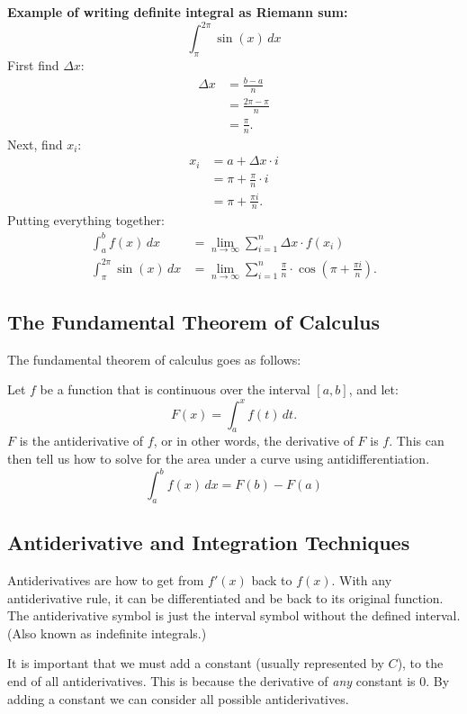 \documentclass[12pt]{article}
\begin{document}
\textbf{Example of writing definite integral as Riemann sum:}
\[ \int_{\pi}^{2 \pi} \sin(x) \, dx \]
First find $\Delta x$:
\begin{align*}
    \Delta x & = \frac{b-a}{n}         \\[6pt]
             & = \frac{2 \pi - \pi}{n} \\[6pt]
             & = \frac{\pi}{n}.
\end{align*}
Next, find $x_i$:
\begin{align*}
    x_i & = a + \Delta x \cdot i        \\
        & = \pi + \frac{\pi}{n} \cdot i \\[6pt]
        & = \pi + \frac{\pi i}{n}.
\end{align*}
Putting everything together:
\begin{align*}
    \int_{a}^{b} f(x) \, dx          & = \lim_{n \to \infty} \sum_{i=1}^{n} \Delta x \cdot f(x_i)                                           \\[6pt]
    \int_{\pi}^{2 \pi} \sin(x) \, dx & = \lim_{n \to \infty} \sum_{i=1}^{n} \frac{\pi}{n} \cdot \cos{\left( \pi + \frac{\pi i}{n} \right)}.
\end{align*}

\subsection{The Fundamental Theorem of Calculus}
\noindent The fundamental theorem of calculus goes as follows:

\noindent Let $f$ be a function that is continuous over the interval $[a, b]$, and let:
\[ F(x) = \int_{a}^{x} f(t) \, dt. \]
$F$ is the antiderivative of $f$, or in other words, the derivative of $F$ is $f$. This can then tell us how to solve for the area under a curve using antidifferentiation.
\[ \int_{a}^{b} f(x) \, dx = F(b) - F(a) \]

\subsection{Antiderivative and Integration Techniques}
Antiderivatives are how to get from $f'(x)$ back to $f(x)$. With any antiderivative rule, it can be differentiated and be back to its original function. The antiderivative symbol is just the interval symbol without the defined interval. (Also known as indefinite integrals.)

It is important that we must add a constant (usually represented by $C$), to the end of all antiderivatives. This is because the derivative of \textit{any} constant is $0$. By adding a constant we can consider all possible antiderivatives. %
\end{document}
